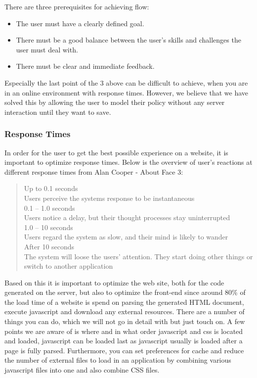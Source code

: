 There are three prerequisites for achieving flow:

\begin{itemize}

  \item The user must have a clearly defined goal.
  \item There must be a good balance between the user's skills and challenges the user must deal with.
  \item There must be clear and immediate feedback.

\end{itemize}

Especially the last point of the 3 above can be difficult to achieve, when you are in an online environment with response times. However, we believe that we have solved this by allowing the user to model their policy without any server interaction until they want to save.

\subsubsection{Response Times}
In order for the user to get the best possible experience on a website, it is important to optimize response times. Below is the overview of user's reactions at different response times from Alan Cooper - About Face 3:

\begin{quotation}
Up to 0.1 seconds
\\Users perceive the systems response to be instantaneous
\\0.1 – 1.0 seconds
\\Users notice a delay, but their thought processes stay uninterrupted
\\1.0 – 10 seconds
\\Users regard the system as slow, and their mind is likely to wander
\\After 10 seconds
\\The system will loose the users’ attention. They start doing other things or switch to another application
\end{quotation}

Based on this it is important to optimize the web site, both for the code generated on the server, but also to optimize the front-end since around 80\% of the load time \cite{responsetimes} of a website is spend on parsing the generated HTML document, execute javascript and download any external resources. There are a number of things you can do, which we will not go in detail with but just touch on. A few points we are aware of is where and in what order javascript and css is located and loaded, javascript can be loaded last as javascript usually is loaded after a page is fully parsed. Furthermore, you can set preferences for cache and reduce the number of external files to load in an application by combining various javascript files into one and also combine CSS files. 

